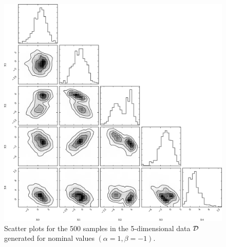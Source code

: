 \documentclass[12pt]{article}
\numberwithin{equation}{section}
\theoremstyle{plain}
\begin{document}
\begin{figure}
    \centering
    \includegraphics[width=1.0\textwidth]{figures/fig4.pdf}
    \caption{Scatter plots for the 500 samples in the 5-dimensional data ${\cal D}$ generated for nominal values $(\alpha=1, \beta=-1)$. }
    \label{fig:4}
\end{figure}
\end{document}
